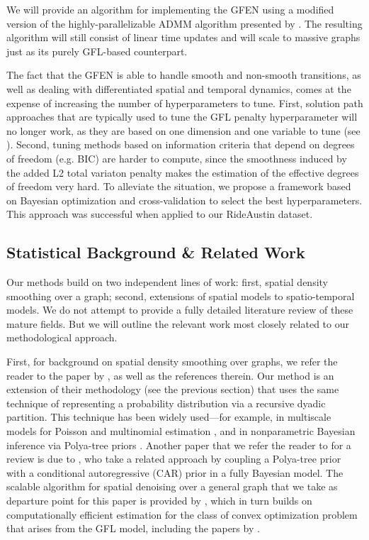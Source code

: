 \documentclass[a4paper, 11pt]{article}
\begin{document}
We will provide an algorithm for implementing the GFEN using a modified version of the highly-parallelizable ADMM algorithm presented by \citet{tansey-scott-2015}. The resulting algorithm will still consist of linear time updates and will scale to massive graphs just as its purely GFL-based counterpart.

The fact that the GFEN is able to handle smooth and non-smooth transitions, as well as dealing with differentiated spatial and temporal dynamics, comes at the expense of increasing the number of hyperparameters to tune. First, solution path approaches that are typically used to tune the GFL penalty hyperparameter will no longer work, as they are based on one dimension and one variable to tune (see \citet{tibshirani-2015}). Second, tuning methods based on information criteria that depend on degrees of freedom (e.g. BIC) are harder to compute, since the smoothness induced by the added L2 total variaton penalty makes the estimation of the effective degrees of freedom very hard. To alleviate the situation, we propose a framework based on Bayesian optimization \citep{shahriari-etal-2016} and cross-validation to select the best hyperparameters. This approach was successful when applied to our RideAustin dataset.
% 

\subsection{Statistical Background \& Related Work}


Our methods build on two independent lines of work: first, spatial density smoothing over a graph; second, extensions of spatial models to spatio-temporal models. We do not attempt to provide a fully detailed literature review of these mature fields. But we will outline the relevant work most closely related to our methodological approach.

First, for background on spatial density smoothing over graphs, we refer the reader to the paper by \citet{tansey-etal-2017}, as well as the references therein. Our method is an extension of their methodology (see the previous section) that uses the same technique of representing a probability distribution via a recursive dyadic partition. This technique has been widely used---for example, in multiscale models for Poisson and multinomial estimation \citep{fryzlewicz-nason-2002, jansen-2006, willett-nowak-2007}, and in nonparametric Bayesian inference via Polya-tree priors \citep{mauldin-1992, lavine-1992, lavine-1994}. Another paper that we refer the reader to for a review is due to \citet{zhao-hanson-2011}, who take a related approach by coupling a Polya-tree prior with a conditional autoregressive (CAR) prior in a fully Bayesian model. The scalable algorithm for spatial denoising over a general graph that we take as departure point for this paper is provided by \citet{tansey-scott-2015}, which in turn builds on computationally efficient estimation for the class of convex optimization problem that arises from the GFL model, including the papers by \citet{tibshirani-taylor-2011, ramdas-tibshirani-2016, wang-2016}. 
\end{document}
